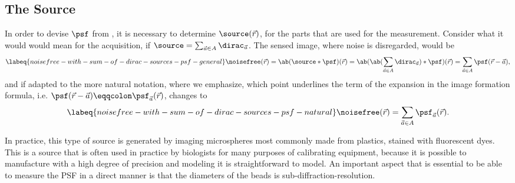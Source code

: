 \subsection{The Source}
In order to devise \(\psf\) from , it is necessary to determine \(\source(\vec{r})\), for the
    parts that are used for the measurement.
Consider what it would would mean for the acquisition, if \(\source= \sum_{\vec{a} \in A} \dirac_{\vec{a}}\).
The sensed image, where noise is disregarded, would be
    \begin{equation}
        \labeq{noisefree-with-sum-of-dirac-sources-psf-general}
        \noisefree(\vec{r}) = \ab(\source * \psf)(\vec{r}) = \ab(\ab(\sum_{\vec{a} \in A} \dirac_{\vec{a}}) * 
            \psf)(\vec{r}) = \sum_{\vec{a} \in A} \psf(\vec{r} - \vec{a}),
    \end{equation}
    and if adapted to the more natural notation, where we emphasize, which point underlines the term of the expansion in
    the image formation formula, i.e. \(\psf(\vec{r} - \vec{a}) \eqqcolon \psf_{\vec{a}}
    (\vec{r})\),  changes to
    \begin{equation}
        \labeq{noisefree-with-sum-of-dirac-sources-psf-natural}
        \noisefree(\vec{r}) = \sum_{\vec{a} \in A} \psf_{\vec{a}}(\vec{r}).
    \end{equation}

In practice, this type of source is generated by imaging microspheres most commonly made from plastics, stained with 
    fluorescent dyes.
This is a source that is often used in practice by biologists for many purposes of calibrating equipment, because it is 
    possible to manufacture with a high degree of precision and modeling it is straightforward to model.
An important aspect that is essential to be able to measure the \ac{PSF} in a direct manner is that the diameters of the
    beads is sub-diffraction-resolution.


